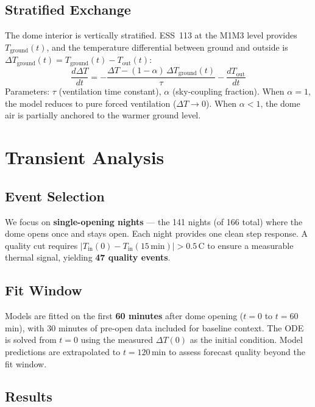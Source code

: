 \documentclass[11pt]{article}
\begin{document}
\subsection{Stratified Exchange}

The dome interior is vertically stratified. ESS~113 at the M1M3 level provides $T_\mathrm{ground}(t)$, and the temperature differential between ground and outside is $\Delta T_\mathrm{ground}(t) = T_\mathrm{ground}(t) - T_\mathrm{out}(t)$:
\begin{equation}
    \frac{d\Delta T}{dt} = -\frac{\Delta T - (1-\alpha)\,\Delta T_\mathrm{ground}(t)}{\tau} - \frac{dT_\mathrm{out}}{dt}
    \label{eq:stratified}
\end{equation}
Parameters: $\tau$ (ventilation time constant), $\alpha$ (sky-coupling fraction). When $\alpha = 1$, the model reduces to pure forced ventilation ($\Delta T \to 0$). When $\alpha < 1$, the dome air is partially anchored to the warmer ground level.

\section{Transient Analysis}

\subsection{Event Selection}

We focus on \textbf{single-opening nights} --- the 141 nights (of 166 total) where the dome opens once and stays open. Each night provides one clean step response. A quality cut requires $|T_\mathrm{in}(0) - T_\mathrm{in}(15\,\mathrm{min})| > 0.5$\,\textdegree C to ensure a measurable thermal signal, yielding \textbf{47 quality events}.

\subsection{Fit Window}

Models are fitted on the first \textbf{60 minutes} after dome opening ($t = 0$ to $t = 60$\,min), with 30 minutes of pre-open data included for baseline context. The ODE is solved from $t = 0$ using the measured $\Delta T(0)$ as the initial condition. Model predictions are extrapolated to $t = 120$\,min to assess forecast quality beyond the fit window.

\subsection{Results}
\end{document}
